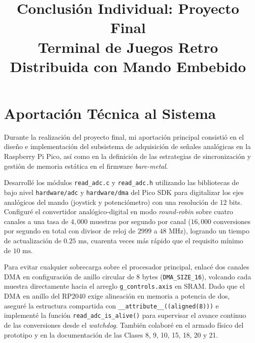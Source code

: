 \documentclass[conference]{IEEEtran}
\begin{document}
\title{Conclusión Individual: Proyecto Final \\
\large Terminal de Juegos Retro Distribuida con Mando Embebido}

\author{
}

\maketitle

\section*{Aportación Técnica al Sistema}

Durante la realización del proyecto final, mi aportación principal consistió en el diseño e implementación del subsistema de adquisición de señales analógicas en la Raspberry Pi Pico, así como en la definición de las estrategias de sincronización y gestión de memoria estática en el firmware \textit{bare-metal}.

Desarrollé los módulos \texttt{read\_adc.c} y \texttt{read\_adc.h} utilizando las bibliotecas de bajo nivel \texttt{hardware/adc} y \texttt{hardware/dma} del Pico SDK para digitalizar los ejes analógicos del mando (joystick y potenciómetro) con una resolución de 12 bits. Configuré el convertidor analógico-digital en modo \textit{round-robin} sobre cuatro canales a una tasa de $4{,}000$ muestras por segundo por canal ($16{,}000$ conversiones por segundo en total con divisor de reloj de $2999$ a $48\text{ MHz}$), logrando un tiempo de actualización de $0.25\text{ ms}$, cuarenta veces más rápido que el requisito mínimo de $10\text{ ms}$.

Para evitar cualquier sobrecarga sobre el procesador principal, enlacé dos canales DMA en configuración de anillo circular de 8 bytes (\texttt{DMA\_SIZE\_16}), volcando cada muestra directamente hacia el arreglo \texttt{g\_controls.axis} en SRAM. Dado que el DMA en anillo del RP2040 exige alineación en memoria a potencia de dos, aseguré la estructura compartida con \texttt{\_\_attribute\_\_((aligned(8)))} e implementé la función \texttt{read\_adc\_is\_alive()} para supervisar el avance continuo de las conversiones desde el \textit{watchdog}. También colaboré en el armado físico del prototipo y en la documentación de las Clases 8, 9, 10, 15, 18, 20 y 21.
\end{document}
